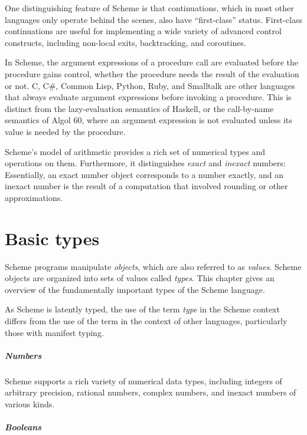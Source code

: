 \vest One distinguishing feature of Scheme is that continuations, which
in most other languages only operate behind the scenes, also have
``first-class'' status.  First-class continuations are useful for implementing a
wide variety of advanced control constructs, including non-local exits,
backtracking, and coroutines.

In Scheme, the argument expressions of a procedure call are evaluated
before the procedure gains control, whether the procedure needs the
result of the evaluation or not.  C, C\#, Common Lisp, Python,
Ruby, and Smalltalk are other languages that always evaluate argument
expressions before invoking a procedure.  This is distinct from the
lazy-evaluation semantics of Haskell, or the call-by-name semantics of
Algol 60, where an argument expression is not evaluated unless its
value is needed by the procedure.

Scheme's model of arithmetic provides a rich set of numerical types
and operations on them.  Furthermore, it distinguishes \textit{exact}
and \textit{inexact} numbers: Essentially, an exact number
object corresponds to a number exactly, and an inexact number
is the result of a computation that involved rounding or other approximations.

\chapter{Basic types}

Scheme programs manipulate \textit{objects}, which are also referred
to as \textit{values}.
Scheme objects are organized into sets of values called \textit{types}.
This chapter gives an overview of the fundamentally important types of the
Scheme language.  

\begin{note}
  As Scheme is latently typed, the use of the term \textit{type} in
  the Scheme context differs from the use of the term in the context of other
  languages, particularly those with manifest typing.
\end{note}

\paragraph{Numbers}

Scheme supports a rich variety of numerical data types, including
integers of arbitrary precision, rational numbers, complex numbers, and
inexact numbers of various kinds.  

\paragraph{Booleans}

